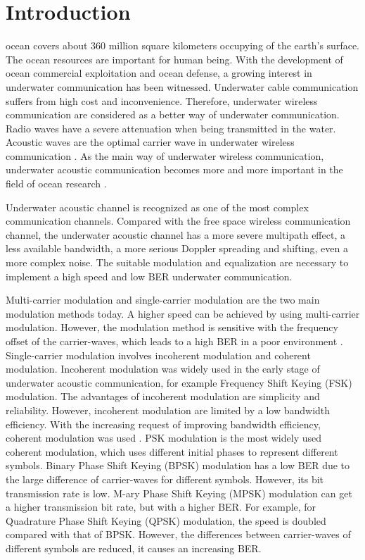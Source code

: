 \documentclass[journal]{IEEEtran}
\begin{document}
\section{Introduction}
 ocean covers about 360 million square
kilometers occupying  of the earth's surface. The ocean
resources are important for human being. With the development of
ocean commercial exploitation and ocean defense, a growing interest
in underwater communication has been witnessed. Underwater cable
communication suffers from high cost and inconvenience. Therefore,
underwater wireless communication are considered as a better way of
underwater communication. Radio waves have a severe attenuation when
being transmitted in the water. Acoustic waves are the optimal
carrier wave in underwater wireless communication
\cite{Stojanovic2008}. As the main way of underwater wireless
communication, underwater acoustic communication becomes more and
more important in the field of ocean research
\cite{Shahabudeen2008}.

Underwater acoustic channel is recognized as one of the most complex
communication channels. Compared with the free space wireless
communication channel, the underwater acoustic channel has a more
severe multipath effect, a less available bandwidth, a more serious
Doppler spreading and shifting, even a more complex
noise\cite{Stojanovic2008,Du2011,Stojanovic2009}. The suitable
modulation and equalization are necessary to implement a high speed
and low BER underwater communication.

Multi-carrier modulation \cite{Li2008} and single-carrier modulation
are the two main modulation methods today. A higher speed can be
achieved by using multi-carrier modulation. However, the modulation
method is sensitive with the frequency offset of the carrier-waves,
which leads to a high BER in a poor environment \cite{He2010}.
Single-carrier modulation involves incoherent modulation and
coherent modulation. Incoherent modulation was widely used in the
early stage of underwater acoustic communication, for example
Frequency Shift Keying (FSK) modulation. The advantages of
incoherent modulation are simplicity and reliability. However,
incoherent modulation are limited by a low bandwidth efficiency.
With the increasing request of improving bandwidth efficiency,
coherent modulation was used \cite{Stojanovic2008}. PSK modulation
is the most widely used coherent modulation, which uses different
initial phases to represent different symbols. Binary Phase Shift
Keying (BPSK) modulation has a low BER due to the large difference
of carrier-waves for different symbols. However, its bit
transmission rate is low. M-ary Phase Shift Keying (MPSK) modulation
can get a higher transmission bit rate, but with a higher BER. For
example, for Quadrature Phase Shift Keying (QPSK) modulation, the
speed is doubled compared with that of BPSK. However, the
differences between carrier-waves of different symbols are reduced,
it causes an increasing BER.
\end{document}
